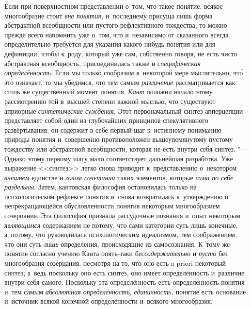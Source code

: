 Если при поверхностном представлении о~том, что такое понятие,
всякое многообразие стоит {\em вне
понятия,} и~последнему присуща лишь форма абстрактной
всеобщности или пустого рефлективного тождества, то можно прежде всего
напомнить уже о~том, что и~независимо от сказанного всегда определительно
требуется для указания какого-нибудь понятия или для
дефиниции, чтобы к~роду, который уже сам, собственно говоря, не есть чисто
абстрактная всеобщность, присоединилась также и
{\em специфическая определённость}.
Если мы только сообразим в~некоторой мере мыслительно, чт\'{о}
это означает, то мы убедимся, что тем самым
{\em различение}
рассматривается как столь же существенный момент понятия.
{\em Кант} положил начало
этому рассмотрению той в~высшей степени важной мыслью, что существуют
априорные {\em синтетические суждения}.
Этот первоначальный синтез апперцепции представляет собой
один из глубочайших принципов спекулятивного развёртывания; он содержит в
себе первый шаг к~истинному пониманию природы понятия и~совершенно
противоположен вышеупомянутому пустому тождеству или абстрактной
всеобщности, которая не есть внутри себя синтез. "--- Однако
этому первому шагу мало соответствует дальнейшая разработка. Уже выражение
<<синтез>> легко снова приводит к~представлению о~некотором
{\em внешнем} единстве и {\em голом сочетании} таких элементов, которые
{\em сами по себе раздельны}.
Затем, кантовская философия остановилась только на
психологическом рефлексе понятия и~снова возвратилась к~утверждению о
непрекращающейся обусловленности понятия некоторым многообразием
созерцания. Эта философия признала рассудочные познания и~опыт некоторым
{\em являющимся}
содержанием не потому, что сами категории суть лишь конечные,
а~потому, что руководилась психологическим идеализмом, тем соображением,
что они суть {\em лишь}
определения, происходящие из самосознания. К~тому же понятие
согласно учению Канта опять-таки
{\em бессодержательно} и
{\em пусто} без
многообразия созерцания, несмотря на то, что оно есть a priori
некоторый синтез; а~ведь поскольку оно есть синтез, оно имеет
определённость и~различие внутри себя самого. Поскольку эта определённость
есть определённость понятия и~тем самым
{\em абсолютная определённость,}
{\em единичность,} понятие
есть основание и~источник всякой конечной определённости и~всякого
многообразия.

